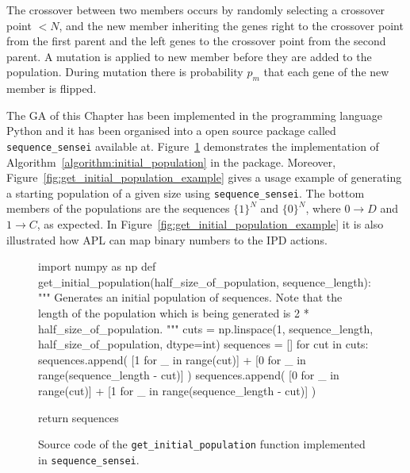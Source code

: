 The crossover between two members occurs by randomly selecting a crossover point
\(< N\), and the new member inheriting the genes right to the crossover point from
the first parent and the left genes to the crossover point from the second
parent. A mutation is applied to new member before they are added to the
population. During mutation there is probability \(p_m\) that each gene of the
new member is flipped.

The GA of this Chapter has been implemented in the programming language Python
and it has been organised into a open source package called
\texttt{sequence_sensei} available at. %
Figure~\ref{fig:get_initial_population} demonstrates the implementation of
Algorithm~\ref{algorithm:initial_population} in the package. Moreover,
Figure~\ref{fig:get_initial_population_example} gives a usage example of
generating a starting population of a given size using
\texttt{sequence_sensei}.
The bottom members of the populations are the sequences \(\{1\}^N\) and
\(\{0\}^N\), where \(0 \to D\) and \(1 \to C\), as expected. In
Figure~\ref{fig:get_initial_population_example} it is also illustrated how APL
can map binary numbers to the IPD actions.

\begin{figure}[!htbp]
\begin{sourcepy}
import numpy as np
def get_initial_population(half_size_of_population, sequence_length):
    """
    Generates an initial population of sequences. Note that the length
    of the population which is being generated is 2 * half_size_of_population.
    """
    cuts = np.linspace(1, sequence_length, half_size_of_population, dtype=int)
    sequences = []
    for cut in cuts:
        sequences.append(
            [1 for _ in range(cut)] + [0 for _ in range(sequence_length - cut)]
        )
        sequences.append(
            [0 for _ in range(cut)] + [1 for _ in range(sequence_length - cut)]
        )

    return sequences
\end{sourcepy}
\caption{Source code of the \texttt{get_initial_population} function
implemented in \texttt{sequence_sensei}.}\label{fig:get_initial_population}
\end{figure}

